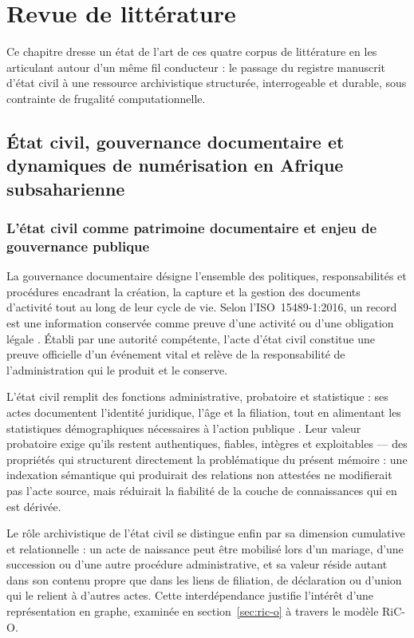\chapter{Revue de littérature}
\label{chap:etat_art}

Ce chapitre dresse un état de l'art de ces quatre corpus de littérature en les articulant autour d'un même fil conducteur : le passage du registre manuscrit d'état civil à une ressource archivistique structurée, interrogeable et durable, sous contrainte de frugalité computationnelle.

\section{État civil, gouvernance documentaire et dynamiques de numérisation en Afrique subsaharienne}
\label{sec:gouvernance-etat-civil}

\subsection{L'état civil comme patrimoine documentaire et enjeu de gouvernance publique}
\label{sec:etat-civil-patrimoine}

La gouvernance documentaire désigne l'ensemble des politiques, responsabilités et procédures encadrant la création, la capture et la gestion des documents d'activité tout au long de leur cycle de vie.
Selon l'ISO~15489-1:2016, un \og record \fg{} est une information conservée comme preuve d'une activité ou d'une obligation légale \cite{iso2016-15489}.
Établi par une autorité compétente, l'acte d'état civil constitue une preuve officielle d'un événement vital et relève de la responsabilité de l'administration qui le produit et le conserve.

L'état civil remplit des fonctions administrative, probatoire et statistique : ses actes documentent l'identité juridique, l'âge et la filiation, tout en alimentant les statistiques démographiques nécessaires à l'action publique \cite{un2023guidelines,HandbookCivilRegistration2023}.
Leur valeur probatoire exige qu'ils restent authentiques, fiables, intègres et exploitables \cite{ica2008module2} --- des propriétés qui structurent directement la problématique du présent mémoire : une indexation sémantique qui produirait des relations non attestées ne modifierait pas l'acte source, mais réduirait la fiabilité de la couche de connaissances qui en est dérivée.

Le rôle archivistique de l'état civil se distingue enfin par sa dimension cumulative et relationnelle : un acte de naissance peut être mobilisé lors d'un mariage, d'une succession ou d'une autre procédure administrative, et sa valeur réside autant dans son contenu propre que dans les liens de filiation, de déclaration ou d'union qui le relient à d'autres actes. Cette interdépendance justifie l'intérêt d'une représentation en graphe, examinée en section~\ref{sec:ric-o} à travers le modèle RiC-O.

